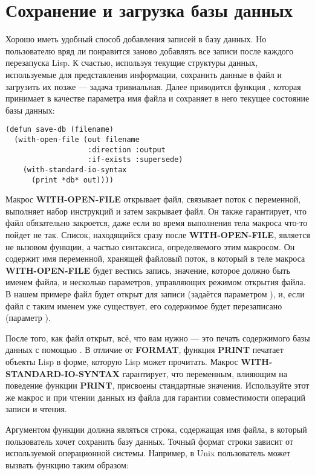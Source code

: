 \section{Сохранение и загрузка базы данных}

Хорошо иметь удобный способ добавления записей в базу данных. Но пользователю вряд ли
понравится заново добавлять все записи после каждого перезапуска Lisp. К счастью,
используя текущие структуры данных, используемые для представления информации, сохранить
данные в файл и загрузить их позже --- задача тривиальная. Далее приводится функция
, которая принимает в качестве параметра имя файла и сохраняет в него
текущее состояние базы данных:

\begin{lstlisting}
(defun save-db (filename)
  (with-open-file (out filename
                   :direction :output
                   :if-exists :supersede)
    (with-standard-io-syntax
      (print *db* out))))
\end{lstlisting}

Макрос \textbf{WITH-OPEN-FILE} открывает файл, связывает поток с переменной, выполняет
набор инструкций и затем закрывает файл. Он также гарантирует, что файл обязательно
закроется, даже если во время выполнения тела макроса что-то пойдет не так. Список,
находящийся сразу после \textbf{WITH-OPEN-FILE}, является не вызовом функции, а частью
синтаксиса, определяемого этим макросом. Он содержит имя переменной, хранящей файловый
поток, в который в теле макроса \textbf{WITH-OPEN-FILE} будет вестись запись, значение,
которое должно быть именем файла, и несколько параметров, управляющих режимом открытия
файла. В нашем примере файл будет открыт для записи (задаётся параметром 
), и, если файл с таким именем уже существует, его содержимое будет
перезаписано (параметр  ).

После того, как файл открыт, всё, что вам нужно --- это печать содержимого базы данных с
помощью . В отличие от \textbf{FORMAT}, функция \textbf{PRINT}
печатает объекты Lisp в форме, которую Lisp может прочитать. Макрос
\textbf{WITH-STANDARD-IO-SYNTAX} гарантирует, что переменным, влияющим на поведение
функции \textbf{PRINT}, присвоены стандартные значения. Используйте этот же макрос и при
чтении данных из файла для гарантии совместимости операций записи и чтения.

Аргументом функции  должна являться строка, содержащая имя файла, в который
пользователь хочет сохранить базу данных. Точный формат строки зависит от используемой
операционной системы. Например, в Unix пользователь может вызвать функцию 
таким образом:

